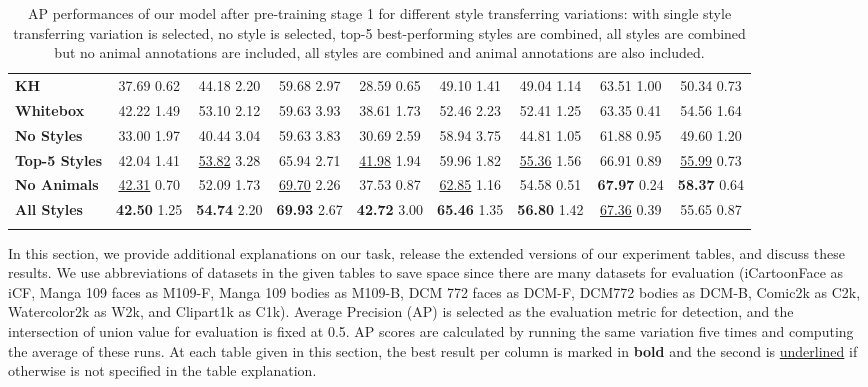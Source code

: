 \documentclass{article}
\begin{document}
\begin{table*}
\begin{tabular}{l|ccc|ccccc}
    \textbf{KH}       & 37.69 {\tiny 0.62}&44.18 {\tiny 2.20}& 59.68 {\tiny 2.97}&28.59 {\tiny 0.65}&49.10 {\tiny 1.41}&49.04 {\tiny 1.14}& {63.51} {\tiny1.00}&50.34 {\tiny0.73} \\
    \textbf{Whitebox} & {{42.22}} {\tiny 1.49}& {{53.10}} {\tiny 2.12}&59.63 {\tiny 3.93}& {{38.61}} {\tiny 1.73}&52.46 {\tiny 2.23}& {52.41} {\tiny 1.25}&63.35 {\tiny0.41}& {54.56} {\tiny1.64} \\
    \noalign{\smallskip}
    \hline
    \noalign{\smallskip}
    \textbf{No Styles}  &33.00 {\tiny 1.97}&40.44 {\tiny 3.04}&59.63 {\tiny 3.83}&30.69 {\tiny 2.59}&58.94 {\tiny 3.75}& 44.81 {\tiny 1.05}& 61.88 {\tiny 0.95}& 49.60 {\tiny 1.20} \\
    \textbf{Top-5 Styles}
    & 42.04 {\tiny 1.41} & \underline{53.82} {\tiny 3.28} & {65.94} {\tiny 2.71}
    & \underline{41.98} {\tiny 1.94} & {59.96} {\tiny 1.82} & \underline{55.36} {\tiny 1.56}
    & {66.91} {\tiny 0.89} & \underline{55.99} {\tiny 0.73} \\
    \textbf{No Animals} &\underline{42.31} {\tiny 0.70}&52.09 {\tiny 1.73}&\underline{69.70} {\tiny 2.26}&37.53 {\tiny 0.87}&\underline{62.85} {\tiny 1.16}& {54.58} {\tiny 0.51}& \textbf{67.97} {\tiny 0.24}& \textbf{58.37} {\tiny 0.64} \\
    \textbf{All Styles} &\textbf{42.50} {\tiny 1.25}&\textbf{54.74} {\tiny 2.20}&\textbf{69.93} {\tiny 2.67}&\textbf{42.72} {\tiny 3.00}&\textbf{65.46} {\tiny 1.35}& \textbf{56.80} {\tiny 1.42}& \underline{67.36} {\tiny 0.39}& {55.65} {\tiny 0.87} \\
    \noalign{\smallskip}
    \hline
\end{tabular}
\caption{AP performances of our model after pre-training stage 1 for different style transferring variations: with single style transferring variation is selected, no style is selected, top-5 best-performing styles are combined, all styles are combined but no animal annotations are included, all styles are combined and animal annotations are also included.}
\label{table:sup_stage_1_results}
\end{table*} 
In this section, we provide additional explanations on our task, release the extended versions of our experiment tables, and discuss these results. We use abbreviations of datasets in the given tables to save space since there are many datasets for evaluation (iCartoonFace as iCF, Manga 109 faces as M109-F,  Manga 109 bodies as M109-B,  DCM 772 faces as DCM-F, DCM772 bodies as DCM-B, Comic2k as C2k, Watercolor2k as W2k, and Clipart1k as C1k). Average Precision (AP) is selected as the evaluation metric for detection, and the intersection of union value for evaluation is fixed at 0.5. AP scores are calculated by running the same variation five times and computing the average of these runs. At each table given in this section, the best result per column is marked in \textbf{bold} and the second is \underline{underlined} if otherwise is not specified in the table explanation.
\end{document}
